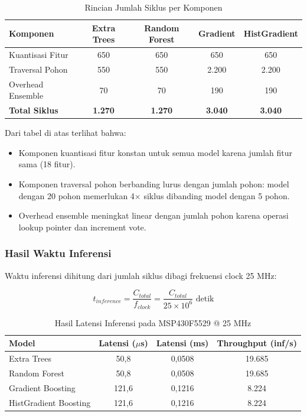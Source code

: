 \begin{table}[htbp]
\centering
\caption{Rincian Jumlah Siklus per Komponen}
\label{tab:msp430_cycles_detail}
\begin{tabular}{lcccc}
\hline
\textbf{Komponen} & \textbf{Extra Trees} & \textbf{Random Forest} & \textbf{Gradient} & \textbf{HistGradient} \\
\hline
Kuantisasi Fitur & 650 & 650 & 650 & 650 \\
Traversal Pohon & 550 & 550 & 2.200 & 2.200 \\
Overhead Ensemble & 70 & 70 & 190 & 190 \\
\textbf{Total Siklus} & \textbf{1.270} & \textbf{1.270} & \textbf{3.040} & \textbf{3.040} \\
\hline
\end{tabular}
\end{table}

Dari tabel di atas terlihat bahwa:
\begin{itemize}
    \item Komponen kuantisasi fitur konstan untuk semua model karena jumlah fitur sama (18 fitur).
    \item Komponen traversal pohon berbanding lurus dengan jumlah pohon: model dengan 20 pohon memerlukan 4$\times$ siklus dibanding model dengan 5 pohon.
    \item Overhead ensemble meningkat linear dengan jumlah pohon karena operasi lookup pointer dan increment vote.
\end{itemize}

\subsubsection{Hasil Waktu Inferensi}

Waktu inferensi dihitung dari jumlah siklus dibagi frekuensi clock 25 MHz:

\begin{equation}
    t_{inference} = \frac{C_{total}}{f_{clock}} = \frac{C_{total}}{25 \times 10^6} \text{ detik}
\end{equation}

\begin{table}[htbp]
\centering
\caption{Hasil Latensi Inferensi pada MSP430F5529 @ 25 MHz}
\label{tab:msp430_latency_id}
\begin{tabular}{lccc}
\hline
\textbf{Model} & \textbf{Latensi ($\mu$s)} & \textbf{Latensi (ms)} & \textbf{Throughput (inf/s)} \\
\hline
Extra Trees & 50,8 & 0,0508 & 19.685 \\
Random Forest & 50,8 & 0,0508 & 19.685 \\
Gradient Boosting & 121,6 & 0,1216 & 8.224 \\
HistGradient Boosting & 121,6 & 0,1216 & 8.224 \\
\hline
\end{tabular}
\end{table}

